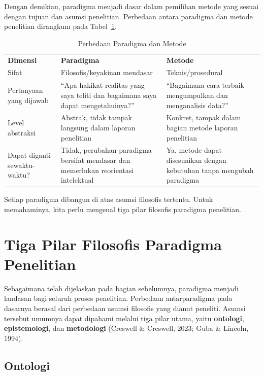 \documentclass[
  indonesian,
  letterpaper,
  DIV=11,
  numbers=noendperiod]{scrreprt}
\begin{document}
Dengan demikian, paradigma menjadi dasar dalam pemilihan metode yang
sesuai dengan tujuan dan asumsi penelitian. Perbedaan antara paradigma
dan metode penelitian dirangkum pada Tabel~\ref{tbl-paradigma}.

\begin{longtable}[]{@{}
  >{\raggedright\arraybackslash}p{}
  >{\raggedright\arraybackslash}p{}
  >{\raggedright\arraybackslash}p{}@{}}
\caption{Perbedaan Paradigma dan
Metode}\label{tbl-paradigma}\tabularnewline
\toprule\noalign{}
\endfirsthead
\endhead
\bottomrule\noalign{}
\endlastfoot
\textbf{Dimensi} & \textbf{Paradigma} & \textbf{Metode} \\
Sifat & Filosofis/keyakinan mendasar & Teknis/prosedural \\
Pertanyaan yang dijawab & ``Apa hakikat realitas yang saya teliti dan
bagaimana saya dapat mengetahuinya?'' & ``Bagaimana cara terbaik
mengumpulkan dan menganalisis data?'' \\
Level abstraksi & Abstrak, tidak tampak langsung dalam laporan
penelitian & Konkret, tampak dalam bagian metode laporan penelitian \\
Dapat diganti sewaktu-waktu? & Tidak, perubahan paradigma bersifat
mendasar dan memerlukan reorientasi intelektual & Ya, metode dapat
disesuaikan dengan kebutuhan tanpa mengubah paradigma \\
\end{longtable}

Setiap paradigma dibangun di atas asumsi filosofis tertentu. Untuk
memahaminya, kita perlu mengenal tiga pilar filosofis paradigma
penelitian.

\section{Tiga Pilar Filosofis Paradigma
Penelitian}\label{tiga-pilar-filosofis-paradigma-penelitian}

Sebagaimana telah dijelaskan pada bagian sebelumnya, paradigma menjadi
landasan bagi seluruh proses penelitian. Perbedaan antarparadigma pada
dasarnya berasal dari perbedaan asumsi filosofis yang dianut peneliti.
Asumsi tersebut umumnya dapat dipahami melalui tiga pilar utama, yaitu
\textbf{ontologi}, \textbf{epistemologi}, dan \textbf{metodologi}
(Creswell \& Creswell, 2023; Guba \& Lincoln, 1994).

\subsection{Ontologi}\label{ontologi}
\end{document}
